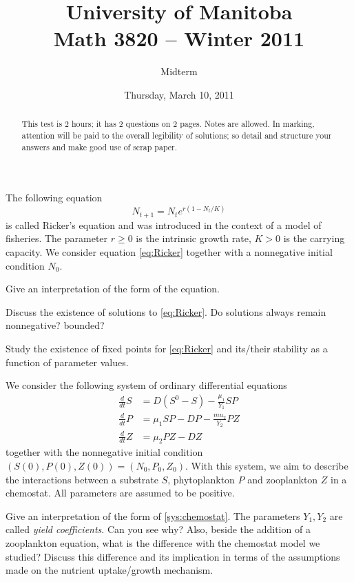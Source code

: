\documentclass[12pt]{article}
\title{University of Manitoba\\ Math 3820 -- Winter 2011}
\author{Midterm}
\date{Thursday, March 10, 2011}
\theoremstyle{plain}
\begin{document}
\maketitle
\begin{abstract}
This test is 2 hours; it has 2 questions on 2 pages. Notes are allowed.
In marking, attention will be paid to the overall legibility of solutions; so detail and structure your answers and make good use of scrap paper.
\end{abstract}

\thispagestyle{empty}


The following equation
\begin{equation}\label{eq:Ricker}
N_{t+1}=N_t e^{r(1-N_t/K)}
\end{equation}
is called Ricker's equation and was introduced in the context of a model of fisheries. The parameter $r\geq 0$ is the intrinsic growth rate, $K>0$ is the carrying capacity. We consider equation \eqref{eq:Ricker} together with a nonnegative initial condition $N_0$.

Give an interpretation of the form of the equation.

Discuss the existence of solutions to \eqref{eq:Ricker}. Do solutions always remain nonnegative? bounded?

Study the existence of fixed points for \eqref{eq:Ricker} and its/their stability as a function of parameter values.




\vskip1cm
We consider the following system of ordinary differential equations
\begin{subequations}\label{sys:chemostat}
\begin{align}
\frac{d}{dt} S &= D(S^0-S)-\frac{\mu_1}{Y_1}SP \label{sys:chemostat_S} \\
\frac{d}{dt} P &= \mu_1 SP -DP-\frac{mu_2}{Y_2}PZ \label{sys:chemostat_P} \\
\frac{d}{dt} Z &= \mu_2 PZ-DZ \label{sys:chemostat_Z} 
\end{align}
\end{subequations}
together with the nonnegative initial condition $(S(0),P(0),Z(0))=(N_0,P_0,Z_0)$. With this system, we aim to describe the interactions between a substrate $S$, phytoplankton $P$ and zooplankton $Z$ in a chemostat. All parameters are assumed to be positive.

Give an interpretation of the form of \eqref{sys:chemostat}. The parameters $Y_1,Y_2$ are called \emph{yield coefficients}. Can you see why? Also, beside the addition of a zooplankton equation, what is the difference with the chemostat model we studied? Discuss this difference and its implication in terms of the assumptions made on the nutrient uptake/growth mechanism.
\end{document}
